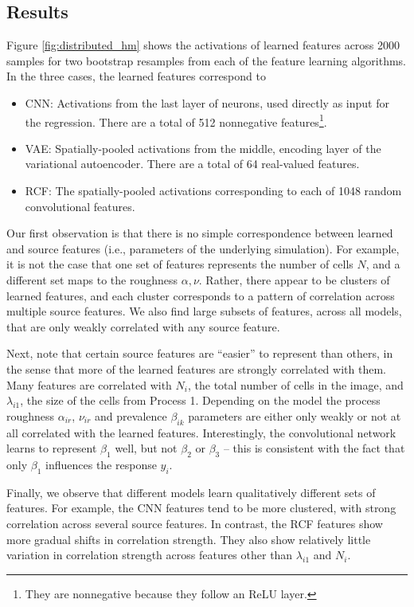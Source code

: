 \subsection{Results}

Figure \ref{fig:distributed_hm} shows the activations of learned features across
2000 samples for two bootstrap resamples from each of the feature learning
algorithms. In the three cases, the learned features correspond to

\begin{itemize}
\item CNN: Activations from the last layer of neurons, used directly as input
  for the regression. There are a total of 512 nonnegative
  features\footnote{They are nonnegative because they follow an ReLU layer.}.
\item VAE: Spatially-pooled activations from the middle, encoding layer of the
  variational autoencoder. There are a total of 64 real-valued features.
\item RCF: The spatially-pooled activations corresponding to each of 1048 random
  convolutional features.
\end{itemize}

Our first observation is that there is no simple correspondence between learned
and source features (i.e., parameters of the underlying simulation). For
example, it is not the case that one set of features represents the number of
cells $N$, and a different set maps to the roughness $\alpha, \nu$. Rather,
there appear to be clusters of learned features, and each cluster corresponds to
a pattern of correlation across multiple source features. We also find large
subsets of features, across all models, that are only weakly correlated with any
source feature.

Next, note that certain source features are ``easier'' to represent than others,
in the sense that more of the learned features are strongly correlated with
them. Many features are correlated with $N_{i}$, the total number of cells in
the image, and $\lambda_{i1}$, the size of the cells from Process 1. Depending
on the model the process roughness $\alpha_{ir}$, $\nu_{ir}$ and prevalence
$\beta_{ik}$ parameters are either only weakly or not at all correlated with the
learned features. Interestingly, the convolutional network learns to represent
$\beta_{1}$ well, but not $\beta_{2}$ or $\beta_{3}$ -- this is consistent with
the fact that only $\beta_{1}$ influences the response $y_{i}$.

Finally, we observe that different models learn qualitatively different sets of
features. For example, the CNN features tend to be more clustered, with strong
correlation across several source features. In contrast, the RCF features show
more gradual shifts in correlation strength. They also show relatively little
variation in correlation strength across features other than $\lambda_{i1}$ and
$N_{i}$.

